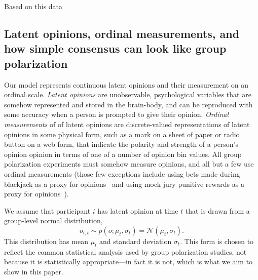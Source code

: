 \documentclass[11pt, letterpaper]{article}
\begin{document}
Based on this data



\subsection{Latent opinions, ordinal measurements, and how simple consensus can look like
group polarization}

Our model represents continuous latent opinions and their 
measurement on an ordinal scale. \emph{Latent opinions} are 
unobservable, psychological variables that are 
somehow represented and stored in the brain-body, and can be reproduced with
some accuracy when a person is prompted to give their opinion. 
\emph{Ordinal measurements} of 
of latent opinions are discrete-valued representations of latent opinions 
in some physical form, such as a mark on a sheet of paper or radio button on a web form, that
indicate the polarity and strength of a person's opinion opinion in terms of
one of a number of opinion bin values. All group polarization experiments must somehow
measure opinions, and all but a few use ordinal measurements (those few exceptions include
using bets made during blackjack as a proxy for opinions~\cite{Blascovich1973,Blascovich1975,Blascovich1976}
and using mock jury punitive rewards as a proxy for opinions~\cite{Schkade2000}).


We assume that participant $i$ has latent opinion at time $t$ that is drawn from
a group-level normal distribution,
\begin{equation}
  o_{i,t} \sim p(o; \mu_t, \sigma_t) = \mathcal{N}(\mu_t, \sigma_t).
  \label{eq:opinionDistribution}
\end{equation}
\noindent 
This distribution has mean $\mu_t$ and standard deviation $\sigma_t$.
This form is chosen to
reflect the common statistical analysis used by group polarization studies,
not because it is statistically appropriate---in fact it is not, which is what
we aim to show in this paper.
\end{document}

